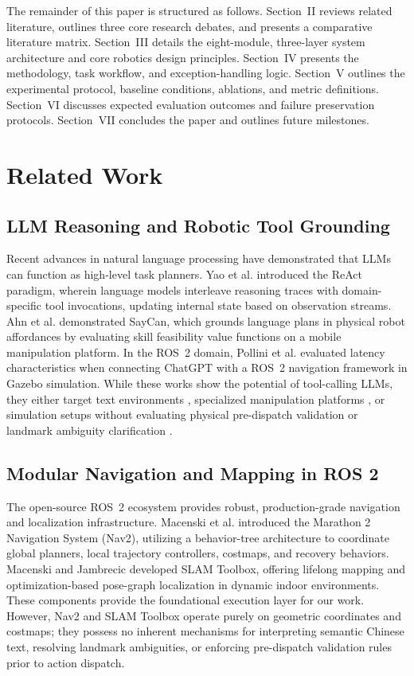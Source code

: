 \documentclass[conference]{IEEEtran}
\begin{document}
The remainder of this paper is structured as follows. Section~II reviews related literature, outlines three core research debates, and presents a comparative literature matrix. Section~III details the eight-module, three-layer system architecture and core robotics design principles. Section~IV presents the methodology, task workflow, and exception-handling logic. Section~V outlines the experimental protocol, baseline conditions, ablations, and metric definitions. Section~VI discusses expected evaluation outcomes and failure preservation protocols. Section~VII concludes the paper and outlines future milestones.

\section{Related Work}

\subsection{LLM Reasoning and Robotic Tool Grounding}
Recent advances in natural language processing have demonstrated that LLMs can function as high-level task planners. Yao et al. \cite{Yao2023react} introduced the ReAct paradigm, wherein language models interleave reasoning traces with domain-specific tool invocations, updating internal state based on observation streams. Ahn et al. \cite{Ahn2022saycan} demonstrated SayCan, which grounds language plans in physical robot affordances by evaluating skill feasibility value functions on a mobile manipulation platform. In the ROS~2 domain, Pollini et al. \cite{Pollini2025latency} evaluated latency characteristics when connecting ChatGPT with a ROS~2 navigation framework in Gazebo simulation. While these works show the potential of tool-calling LLMs, they either target text environments \cite{Yao2023react}, specialized manipulation platforms \cite{Ahn2022saycan}, or simulation setups without evaluating physical pre-dispatch validation or landmark ambiguity clarification \cite{Pollini2025latency}.

\subsection{Modular Navigation and Mapping in ROS 2}
The open-source ROS~2 ecosystem provides robust, production-grade navigation and localization infrastructure. Macenski et al. \cite{Macenski2020marathon2} introduced the Marathon 2 Navigation System (Nav2), utilizing a behavior-tree architecture to coordinate global planners, local trajectory controllers, costmaps, and recovery behaviors. Macenski and Jambrecic \cite{Macenski2021slamtoolbox} developed SLAM Toolbox, offering lifelong mapping and optimization-based pose-graph localization in dynamic indoor environments. These components provide the foundational execution layer for our work. However, Nav2 and SLAM Toolbox operate purely on geometric coordinates and costmaps; they possess no inherent mechanisms for interpreting semantic Chinese text, resolving landmark ambiguities, or enforcing pre-dispatch validation rules prior to action dispatch.
\end{document}
